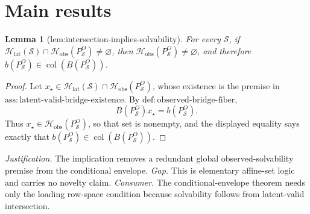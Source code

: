 \documentclass{article}
\newtheorem{lemma}{Lemma}
\begin{document}
\section{Main results}

\begin{lemma}[lem:intersection-implies-solvability]\label{lem:intersection-implies-solvability}
For every \(\mathcal S\), if \(\mathcal H_{\mathrm{lat}}(\mathcal S)\cap\mathcal H_{\mathrm{obs}}(P_{\mathcal S}^O)\neq\varnothing\), then \(\mathcal H_{\mathrm{obs}}(P_{\mathcal S}^O)\neq\varnothing\), and therefore \(b(P_{\mathcal S}^O)\in\operatorname{col}(B(P_{\mathcal S}^O))\).
\end{lemma}
\begin{proof}
Let \(x_\star\in\mathcal H_{\mathrm{lat}}(\mathcal S)\cap
\mathcal H_{\mathrm{obs}}(P_{\mathcal S}^O)\), whose existence is the premise in
\(\mathrm{ass{:}latent\text{-}valid\text{-}bridge\text{-}existence}\).  By
\(\mathrm{def{:}observed\text{-}bridge\text{-}fiber}\),
\[
 B(P_{\mathcal S}^O)x_\star=b(P_{\mathcal S}^O).
\]
Thus \(x_\star\in\mathcal H_{\mathrm{obs}}(P_{\mathcal S}^O)\), so that set is
nonempty, and the displayed equality says exactly that
\(b(P_{\mathcal S}^O)\in\operatorname{col}(B(P_{\mathcal S}^O))\).
\end{proof}
\par\smallskip\noindent \textit{Justification.} The implication removes a redundant global observed-solvability premise from the conditional envelope. \textit{Gap.} This is elementary affine-set logic and carries no novelty claim. \textit{Consumer.} The conditional-envelope theorem needs only the loading row-space condition because solvability follows from latent-valid intersection.
\end{document}
